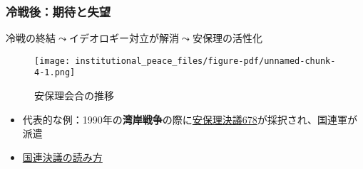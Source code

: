 \documentclass[
  xelatex,
  ja=standard]{bxjsarticle}
\providecommand{\tightlist}{%
  \setlength{\itemsep}{0pt}\setlength{\parskip}{0pt}}\usepackage{longtable,booktabs,array}
\begin{document}
\hypertarget{ux51b7ux6226ux5f8cux671fux5f85ux3068ux5931ux671b}{%
\subsubsection{冷戦後：期待と失望}\label{ux51b7ux6226ux5f8cux671fux5f85ux3068ux5931ux671b}}

冷戦の終結\(\leadsto\)イデオロギー対立が解消\(\leadsto\)安保理の活性化

\begin{figure}[htpb]

{\centering \texttt{[image: institutional\_peace\_files/figure-pdf/unnamed-chunk-4-1.png]}

}

\caption{安保理会合の推移}

\end{figure}

\begin{itemize}
\tightlist
\item
  代表的な例：1990年の\textbf{湾岸戦争}の際に\href{https://digitallibrary.un.org/record/102245}{安保理決議678}が採択され、国連軍が派遣
\item
  \href{https://research.un.org/en/docs/resolutions}{国連決議の読み方}
\end{itemize}
\end{document}
